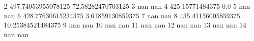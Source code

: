 2 497.74053955078125 72.58282470703125
3 nan nan
4 425.15771484375 0.0
5 nan nan
6 428.77630615234375 3.61859130859375
7 nan nan
8 435.41156005859375 10.25384521484375
9 nan nan
10 nan nan
11 nan nan
12 nan nan
13 nan nan
14 nan nan
